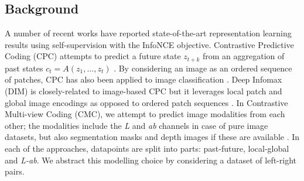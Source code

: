 \subsection{Background}


A number of recent works have reported state-of-the-art representation learning results using self-supervision with the InfoNCE objective.
Contrastive Predictive Coding (CPC) attempts to predict a future state $z_{t+k}$ from an aggregation of past states $c_t = A(z_1, ..., z_t)$ \cite{oord2018representation}. 
By considering an image as an ordered sequence of patches, CPC has also been applied to image classification \cite{henaff2019data}. 
Deep Infomax (DIM) is closely-related to image-based CPC but it leverages local patch and global image encodings as opposed to ordered patch sequences \cite{hjelm2018learning}.
In Contrastive Multi-view Coding (CMC), we attempt to predict image modalities from each other; the modalities include the \textit{L} and \textit{ab} channels in case of pure image datasets, but also segmentation masks and depth images if these are available \cite{tian2019contrastive}. 
In each of the approaches, datapoints are split into parts: past-future, local-global and \textit{L-ab}.
We abstract this modelling choice by considering a dataset of left-right pairs.



